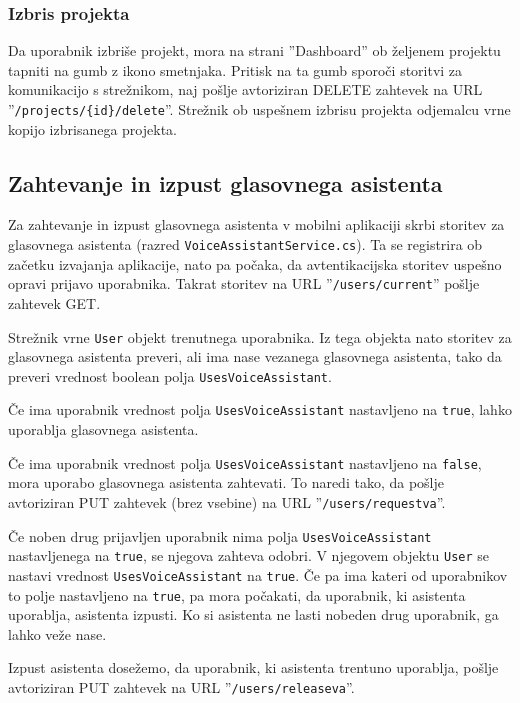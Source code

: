 \documentclass[a4paper, 12pt]{book}
\begin{document}
\subsubsection{Izbris projekta}

Da uporabnik izbriše projekt, mora na strani ''Dashboard'' ob željenem projektu tapniti na gumb z ikono smetnjaka.
Pritisk na ta gumb sporoči storitvi za komunikacijo s strežnikom, naj pošlje avtoriziran DELETE zahtevek na URL ''\texttt{/projects/\{id\}/delete}''.
Strežnik ob uspešnem izbrisu projekta odjemalcu vrne kopijo izbrisanega projekta.

\subsection{Zahtevanje in izpust glasovnega asistenta}

Za zahtevanje in izpust glasovnega asistenta v mobilni aplikaciji skrbi storitev za glasovnega asistenta (razred \texttt{VoiceAssistantService.cs}).
Ta se registrira ob začetku izvajanja aplikacije, nato pa počaka, da avtentikacijska storitev uspešno opravi prijavo uporabnika.
Takrat storitev na URL ''\texttt{/users/current}'' pošlje zahtevek GET.

Strežnik vrne \texttt{User} objekt trenutnega uporabnika.
Iz tega objekta nato storitev za glasovnega asistenta preveri, ali ima nase vezanega glasovnega asistenta, tako da preveri vrednost boolean polja \texttt{UsesVoiceAssistant}.

Če ima uporabnik vrednost polja \texttt{UsesVoiceAssistant} nastavljeno na \texttt{true}, lahko uporablja glasovnega asistenta.

Če ima uporabnik vrednost polja \texttt{UsesVoiceAssistant} nastavljeno na \texttt{false}, mora uporabo glasovnega asistenta zahtevati.
To naredi tako, da pošlje avtoriziran PUT zahtevek (brez vsebine) na URL ''\texttt{/users/requestva}''.

Če noben drug prijavljen uporabnik nima polja \texttt{UsesVoiceAssistant} nastavljenega na \texttt{true}, se njegova zahteva odobri.
V njegovem objektu \texttt{User} se nastavi vrednost \texttt{UsesVoiceAssistant} na \texttt{true}.
Če pa ima kateri od uporabnikov to polje nastavljeno na \texttt{true}, pa mora počakati, da uporabnik, ki asistenta uporablja, asistenta izpusti.
Ko si asistenta ne lasti nobeden drug uporabnik, ga lahko veže nase.

Izpust asistenta dosežemo, da uporabnik, ki asistenta trentuno uporablja, pošlje avtoriziran PUT zahtevek na URL ''\texttt{/users/releaseva}''.
\end{document}
